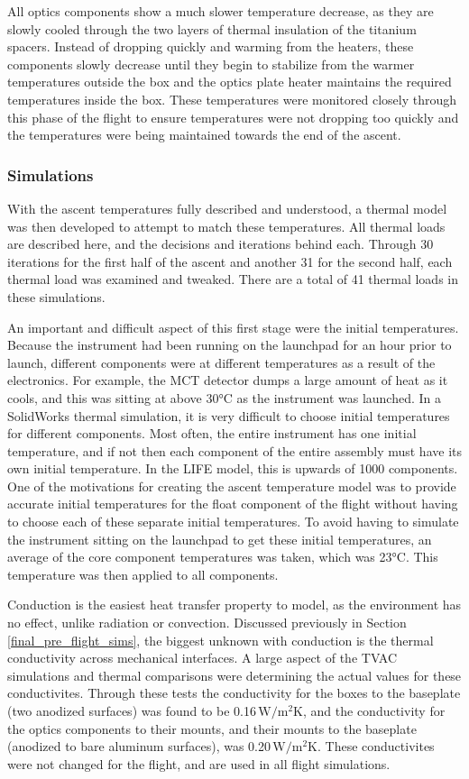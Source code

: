 All optics components show a much slower temperature decrease, as they are slowly cooled through the two layers of thermal insulation of the titanium spacers. Instead of dropping quickly and warming from the heaters, these components slowly decrease until they begin to stabilize from the warmer temperatures outside the box and the optics plate heater maintains the required temperatures inside the box. These temperatures were monitored closely through this phase of the flight to ensure temperatures were not dropping too quickly and the temperatures were being maintained towards the end of the ascent.

\subsubsection{Simulations}
With the ascent temperatures fully described and understood, a thermal model was then developed to attempt to match these temperatures. All thermal loads are described here, and the decisions and iterations behind each. Through 30 iterations for the first half of the ascent and another 31 for the second half, each thermal load was examined and tweaked. There are a total of 41 thermal loads in these simulations.

An important and difficult aspect of this first stage were the initial temperatures. Because the instrument had been running on the launchpad for an hour prior to launch, different components were at different temperatures as a result of the electronics. For example, the MCT detector dumps a large amount of heat as it cools, and this was sitting at above 30°C as the instrument was launched. In a SolidWorks thermal simulation, it is very difficult to choose initial temperatures for different components. Most often, the entire instrument has one initial temperature, and if not then each component of the entire assembly must have its own initial temperature. In the LIFE model, this is upwards of 1000 components. One of the motivations for creating the ascent temperature model was to provide accurate initial temperatures for the float component of the flight without having to choose each of these separate initial temperatures. To avoid having to simulate the instrument sitting on the launchpad to get these initial temperatures, an average of the core component temperatures was taken, which was 23°C. This temperature was then applied to all components. 

Conduction is the easiest heat transfer property to model, as the environment has no effect, unlike radiation or convection. Discussed previously in Section \ref{final_pre_flight_sims}, the biggest unknown with conduction is the thermal conductivity across mechanical interfaces. A large aspect of the TVAC simulations and thermal comparisons were determining the actual values for these conductivites. Through these tests the conductivity for the boxes to the baseplate (two anodized surfaces) was found to be 0.16\,$\mathrm{W/m^2K}$, and the conductivity for the optics components to their mounts, and their mounts to the baseplate (anodized to bare aluminum surfaces), was 0.20\,$\mathrm{W/m^2K}$. These conductivites were not changed for the flight, and are used in all flight simulations.

